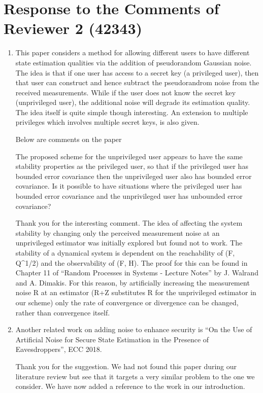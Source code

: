 \documentclass[a4paper]{scrartcl}
\newenvironment{rebuttal}{\begin{enumerate}[label={\color{grey}\thesection.\arabic{enumi}},leftmargin=0pt,ref=\thesection.\arabic{enumi}]}{\end{enumerate}}
\newcommand{\reviewtext}[1]{{\color{nblue} #1}}
\begin{document}
\section*{Response to the Comments of Reviewer 2 (42343)}
\def\thesection{R2}
\begin{rebuttal}
\item \reviewtext{This paper considers a method for allowing different users to have different state estimation qualities via the addition of pseudorandom Gaussian noise. The idea is that if one user has access to a secret key (a privileged user), then that user can construct and hence subtract the pseudorandrom noise from the received measurements. While if the user does not know the secret key (unprivileged user), the additional noise will degrade its estimation quality. The idea itself is quite simple though interesting. An extension to multiple privileges which involves multiple secret keys, is also given. 

Below are comments on the paper

The proposed scheme for the unprivileged user appears to have the same stability properties as the privileged user, so that if the privileged user has bounded error covariance then the unprivileged user also has bounded error covariance. Is it possible to have situations where the privileged user has bounded error covariance and the unprivileged user has unbounded error covariance?}

Thank you for the interesting comment. The idea of affecting the system stability by changing only the perceived measurement noise at an unprivileged estimator was initially explored but found not to work. The stability of a dynamical system is dependent on the reachability of (F, Q\^{}1/2) and the observability of (F, H). The proof for this can be found in Chapter 11 of ``Random Processes in Systems - Lecture Notes'' by J. Walrand and A. Dimakis. For this reason, by artificially increasing the measurement noise R at an estimator (R+Z substitutes R for the unprivileged estimator in our scheme) only the rate of convergence or divergence can be changed, rather than convergence itself.

\item \reviewtext{Another related work on adding noise to enhance security is ``On the Use of Artificial Noise for Secure State Estimation in the Presence of Eavesdroppers'', ECC 2018.}

Thank you for the suggestion. We had not found this paper during our literature review but see that it targets a very similar problem to the one we consider. We have now added a reference to the work in our introduction.


\end{rebuttal}
\end{document}
